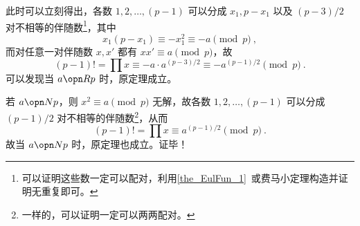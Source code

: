 此时可以立刻得出，各数 $1, 2, \dots, (p-1)$ 可以分成 $x_1, p-x_1$ 以及 $(p-3)/2$ 对不相等的伴随数\footnote{可以证明这些数一定可以配对，利用\autoref{the_EulFun_1}~或费马小定理构造并证明无重复即可。}，其中
\begin{equation}
x_1(p-x_1) \equiv -x_1^2 \equiv -a \pmod p ~,
\end{equation}
而对任意一对伴随数 $x, x'$ 都有 $xx' \equiv a \pmod p$，故
\begin{equation}
(p-1)! = \prod x \equiv -a \cdot a^{(p-3)/2} \equiv -a ^{(p-1)/2} \pmod p ~.
\end{equation}
可以发现当 $a \opn R p$ 时，原定理成立。

若 $a \opn N p$，则 $x^2 \equiv a \pmod p$ 无解，故各数 $1, 2, \dots, (p-1)$ 可以分成 $(p-1)/2$ 对不相等的伴随数\footnote{一样的，可以证明一定可以两两配对。}，从而
\begin{equation}
(p-1)! = \prod x \equiv a^{(p-1)/2} \pmod p ~.
\end{equation}
故当 $a \opn N p$ 时，原定理也成立。证毕！